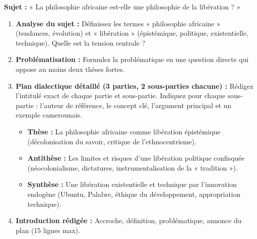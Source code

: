 \documentclass[11pt]{article}
\begin{document}
\begin{exercice}
\textbf{Sujet :} « La philosophie africaine est-elle une philosophie de la libération ? »

\begin{enumerate}
    \item \textbf{Analyse du sujet :} Définissez les termes « philosophie africaine » (tendances, évolution) et « libération » (épistémique, politique, existentielle, technique). Quelle est la tension centrale ?
    \item \textbf{Problématisation :} Formulez la problématique en une question directe qui oppose au moins deux thèses fortes.
    \item \textbf{Plan dialectique détaillé (3 parties, 2 sous-parties chacune) :} Rédigez l'intitulé exact de chaque partie et sous-partie. Indiquez pour chaque sous-partie : l'auteur de référence, le concept clé, l'argument principal et un exemple camerounais.
    \begin{itemize}
        \item \textbf{Thèse :} La philosophie africaine comme libération épistémique (décolonisation du savoir, critique de l'ethnocentrisme).
        \item \textbf{Antithèse :} Les limites et risques d'une libération politique confisquée (néocolonialisme, dictatures, instrumentalisation de la « tradition »).
        \item \textbf{Synthèse :} Une libération existentielle et technique par l'innovation endogène (Ubuntu, Palabre, éthique du développement, appropriation technique).
    \end{itemize}
    \item \textbf{Introduction rédigée :} Accroche, définition, problématique, annonce du plan (15 lignes max).
\end{enumerate}
\end{exercice}
\end{document}
